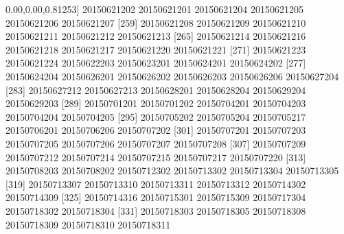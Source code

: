 \documentclass[
]{book}
\newenvironment{Shaded}{\begin{snugshade}}{\end{snugshade}}
\newcommand{\DecValTok}[1]{\textcolor[rgb]{0.00,0.00,0.81}{#1}}
\newcommand{\NormalTok}[1]{#1}
\begin{document}
\begin{Shaded}
\begin{Highlighting}[]
\NormalTok{[}\DecValTok{253}\NormalTok{] }\DecValTok{20150621202} \DecValTok{20150621201} \DecValTok{20150621204} \DecValTok{20150621205} \DecValTok{20150621206} \DecValTok{20150621207}
\NormalTok{[}\DecValTok{259}\NormalTok{] }\DecValTok{20150621208} \DecValTok{20150621209} \DecValTok{20150621210} \DecValTok{20150621211} \DecValTok{20150621212} \DecValTok{20150621213}
\NormalTok{[}\DecValTok{265}\NormalTok{] }\DecValTok{20150621214} \DecValTok{20150621216} \DecValTok{20150621218} \DecValTok{20150621217} \DecValTok{20150621220} \DecValTok{20150621221}
\NormalTok{[}\DecValTok{271}\NormalTok{] }\DecValTok{20150621223} \DecValTok{20150621224} \DecValTok{20150622203} \DecValTok{20150623201} \DecValTok{20150624201} \DecValTok{20150624202}
\NormalTok{[}\DecValTok{277}\NormalTok{] }\DecValTok{20150624204} \DecValTok{20150626201} \DecValTok{20150626202} \DecValTok{20150626203} \DecValTok{20150626206} \DecValTok{20150627204}
\NormalTok{[}\DecValTok{283}\NormalTok{] }\DecValTok{20150627212} \DecValTok{20150627213} \DecValTok{20150628201} \DecValTok{20150628204} \DecValTok{20150629204} \DecValTok{20150629203}
\NormalTok{[}\DecValTok{289}\NormalTok{] }\DecValTok{20150701201} \DecValTok{20150701202} \DecValTok{20150704201} \DecValTok{20150704203} \DecValTok{20150704204} \DecValTok{20150704205}
\NormalTok{[}\DecValTok{295}\NormalTok{] }\DecValTok{20150705202} \DecValTok{20150705204} \DecValTok{20150705217} \DecValTok{20150706201} \DecValTok{20150706206} \DecValTok{20150707202}
\NormalTok{[}\DecValTok{301}\NormalTok{] }\DecValTok{20150707201} \DecValTok{20150707203} \DecValTok{20150707205} \DecValTok{20150707206} \DecValTok{20150707207} \DecValTok{20150707208}
\NormalTok{[}\DecValTok{307}\NormalTok{] }\DecValTok{20150707209} \DecValTok{20150707212} \DecValTok{20150707214} \DecValTok{20150707215} \DecValTok{20150707217} \DecValTok{20150707220}
\NormalTok{[}\DecValTok{313}\NormalTok{] }\DecValTok{20150708203} \DecValTok{20150708202} \DecValTok{20150712302} \DecValTok{20150713302} \DecValTok{20150713304} \DecValTok{20150713305}
\NormalTok{[}\DecValTok{319}\NormalTok{] }\DecValTok{20150713307} \DecValTok{20150713310} \DecValTok{20150713311} \DecValTok{20150713312} \DecValTok{20150714302} \DecValTok{20150714309}
\NormalTok{[}\DecValTok{325}\NormalTok{] }\DecValTok{20150714316} \DecValTok{20150715301} \DecValTok{20150715309} \DecValTok{20150717304} \DecValTok{20150718302} \DecValTok{20150718304}
\NormalTok{[}\DecValTok{331}\NormalTok{] }\DecValTok{20150718303} \DecValTok{20150718305} \DecValTok{20150718308} \DecValTok{20150718309} \DecValTok{20150718310} \DecValTok{20150718311}

\end{Highlighting}
\end{Shaded}
\end{document}
